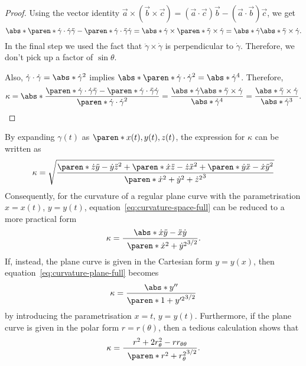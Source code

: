 \documentclass[11pt]{penrose}
\begin{document}
\begin{proof}
    Using the vector identity $\vec{a} \times (\vec{b} \times \vec{c}) = (\vec{a} \cdot \vec{c})\vec{b} - (\vec{a} \cdot \vec{b})\vec{c}$, we get
    \begin{equation}
        \abs*{ \paren*{\dot{\gamma} \cdot \dot{\gamma}} \ddot{\gamma} - \paren*{\dot{\gamma} \cdot \ddot{\gamma}} \dot{\gamma} }
        = \abs*{ \dot{\gamma} \times \paren*{\ddot{\gamma} \times \dot{\gamma}} }
        = \abs*{ \dot{\gamma} } \abs*{ \ddot{\gamma} \times \dot{\gamma} }.
    \end{equation}
    In the final step we used the fact that $\ddot{\gamma} \times \dot{\gamma}$ is perpendicular to $\dot{\gamma}$. Therefore, we don't pick up a factor of $\sin\theta$.

    Also, $\dot{\gamma} \cdot \dot{\gamma} = \abs*{\dot{\gamma}}^2$ implies $\abs*{ \paren*{\dot{\gamma} \cdot \dot{\gamma}}^2 } = \abs*{\dot{\gamma}}^4$. Therefore,
    \begin{equation}
        \kappa
        = \abs*{ \dfrac{ \paren*{\dot{\gamma} \cdot \dot{\gamma}} \ddot{\gamma} - \paren*{\dot{\gamma} \cdot \ddot{\gamma}} \dot{\gamma} }{ \paren*{\dot{\gamma} \cdot \dot{\gamma}}^2 } }
        = \frac{\abs*{ \dot{\gamma} } \abs*{ \ddot{\gamma} \times \dot{\gamma} }}{\abs*{\dot{\gamma}}^4}
        = \frac{\abs*{ \ddot{\gamma} \times \dot{\gamma} }}{\abs*{\dot{\gamma}}^3}.\qedhere
    \end{equation}
\end{proof}

By expanding $\gamma(t)$ as $\paren*{x(t), y(t), z(t)}$, the expression for $\kappa$ can be written as
\begin{equation}
    \kappa
    = \sqrt{ \frac{ \paren*{\dot{z}\ddot{y}-\dot{y}\ddot{z}}^2 + \paren*{\dot{x}\ddot{z}-\dot{z}\ddot{x}}^2 + \paren*{\dot{y}\ddot{x}-\dot{x}\ddot{y}}^2 }{\paren*{\dot{x}^2 + \dot{y}^2 + \dot{z}^2}^3} }
    \label{eq:curvature-space-full}
\end{equation}
Consequently, for the curvature of a regular plane curve with the parametrisation $x = x(t)$, $y = y(t)$, equation~\eqref{eq:curvature-space-full} can be reduced to a more practical form
\begin{equation}
    \kappa = \frac{\abs*{\dot{x}\ddot{y} - \ddot{x}\dot{y}}}{\phantom{1}\paren*{\dot{x}^2+\dot{y}^2}^{3/2}}.
    \label{eq:curvature-plane-full}
\end{equation}
If, instead, the plane curve is given in the Cartesian form $y = y(x)$, then equation~\eqref{eq:curvature-plane-full} becomes
\begin{equation}
    \kappa = \frac{\abs*{y''}}{\paren*{1+y'^2}^{3/2}}
    \label{eq:curvature-cartesian}
\end{equation}
by introducing the parametrisation $x = t$, $y =y(t)$. Furthermore, if the plane curve is given in the polar form $r = r(\theta)$, then a tedious calculation shows that
\begin{equation}
    \kappa = \frac{r^2 + 2 r_{\theta}^{2} - r r_{\theta\theta}}{\phantom{1}\paren*{r^{2}+r_{\theta}^{2}}^{3/2}}.
    \label{eq:curvature-polar}
\end{equation}
\end{document}
